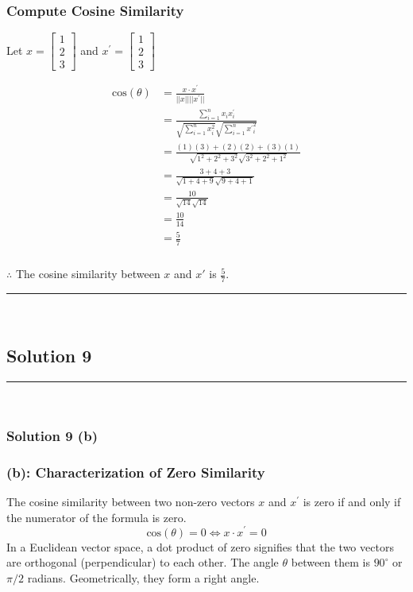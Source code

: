 \documentclass{article}
\begin{document}
\subsubsection*{Compute Cosine Similarity}
\parbox{\textwidth}{
  Let $x=\begin{bmatrix} 1 \\ 2 \\ 3 \end{bmatrix}$ and $x^{\prime}=\begin{bmatrix} 1 \\ 2 \\ 3 \end{bmatrix}$

}
\begin{align*}
    \text{cos}(\theta) &= \frac{x \cdot x^{\prime}}{||x|| ||x^{\prime}||} \\
    &= \frac{\sum_{i=1}^{n}x_{i}x^{\prime}_{i}}{\sqrt{\sum_{i=1}^{n}x_{i}^2}\sqrt{\sum_{i=1}^{n}{x^{\prime}}_{i}^2}} \\
    &= \frac{(1)(3) + (2)(2) + (3)(1)}{\sqrt{1^2+2^2+3^2} \sqrt{3^2+2^2+1^2}} \\
    &= \frac{3 + 4 + 3}{\sqrt{1+4+9} \sqrt{9+4+1}} \\
    &= \frac{10}{\sqrt{14} \sqrt{14}} \\
    &= \frac{10}{14} \\
    &= \frac{5}{7}
\end{align*}
\subsubsection*{\normalfont}{$\therefore$ The cosine similarity between $x$ and $x'$ is $\frac{5}{7}$.}


\noindent\rule{\textwidth}{0.4pt}\\

\newpage

\subsection*{Solution 9}
\noindent\rule{\textwidth}{0.4pt}\\
\subsubsection*{Solution 9 (b)}
\subsubsection*{(b): Characterization of Zero Similarity}
\parbox{\textwidth}{
The cosine similarity between two non-zero vectors $x$ and $x^{\prime}$ is zero if and only if the numerator of the formula is zero.
$$ \text{cos}(\theta) = 0 \iff x \cdot x^{\prime} = 0 $$
In a Euclidean vector space, a dot product of zero signifies that the two vectors are orthogonal (perpendicular) to each other. The angle $\theta$ between them is $90^\circ$ or $\pi/2$ radians. Geometrically, they form a right angle.
}
\end{document}
